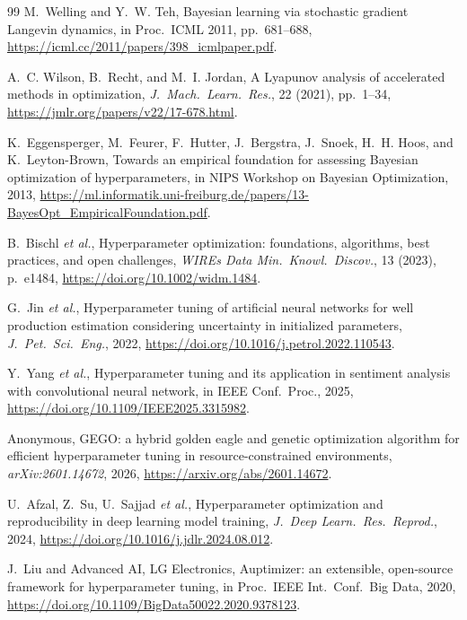 \documentclass[11pt]{article}
\theoremstyle{definition}
\begin{document}
\begin{thebibliography}{99}
M.~Welling and Y.~W. Teh,
Bayesian learning via stochastic gradient Langevin dynamics,
in Proc.\ ICML 2011, pp.~681--688,
\url{https://icml.cc/2011/papers/398_icmlpaper.pdf}.

A.~C. Wilson, B.~Recht, and M.~I. Jordan,
A Lyapunov analysis of accelerated methods in optimization,
\textit{J.\ Mach.\ Learn.\ Res.}, 22 (2021), pp.~1--34,
\url{https://jmlr.org/papers/v22/17-678.html}.

K.~Eggensperger, M.~Feurer, F.~Hutter, J.~Bergstra, J.~Snoek,
H.~H. Hoos, and K.~Leyton-Brown,
Towards an empirical foundation for assessing Bayesian optimization of
hyperparameters,
in NIPS Workshop on Bayesian Optimization, 2013,
\url{https://ml.informatik.uni-freiburg.de/papers/13-BayesOpt_EmpiricalFoundation.pdf}.

B.~Bischl \textit{et al.},
Hyperparameter optimization: foundations, algorithms, best practices,
and open challenges,
\textit{WIREs Data Min.\ Knowl.\ Discov.}, 13 (2023), p.~e1484,
\url{https://doi.org/10.1002/widm.1484}.

G.~Jin \textit{et al.},
Hyperparameter tuning of artificial neural networks for well production
estimation considering uncertainty in initialized parameters,
\textit{J.\ Pet.\ Sci.\ Eng.}, 2022,
\url{https://doi.org/10.1016/j.petrol.2022.110543}.

Y.~Yang \textit{et al.},
Hyperparameter tuning and its application in sentiment analysis with
convolutional neural network,
in IEEE Conf.\ Proc., 2025,
\url{https://doi.org/10.1109/IEEE2025.3315982}.

Anonymous,
GEGO: a hybrid golden eagle and genetic optimization algorithm for efficient
hyperparameter tuning in resource-constrained environments,
\textit{arXiv:2601.14672}, 2026,
\url{https://arxiv.org/abs/2601.14672}.

U.~Afzal, Z.~Su, U.~Sajjad \textit{et al.},
Hyperparameter optimization and reproducibility in deep learning model
training,
\textit{J.\ Deep Learn.\ Res.\ Reprod.}, 2024,
\url{https://doi.org/10.1016/j.jdlr.2024.08.012}.

J.~Liu and Advanced AI, LG Electronics,
Auptimizer: an extensible, open-source framework for hyperparameter tuning,
in Proc.\ IEEE Int.\ Conf.\ Big Data, 2020,
\url{https://doi.org/10.1109/BigData50022.2020.9378123}.


\end{thebibliography}
\end{document}
